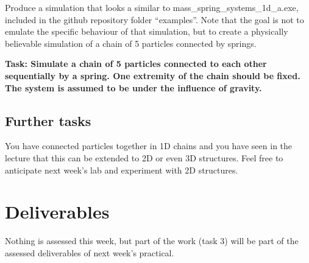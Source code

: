 \documentclass[12pt]{article}
\begin{document}
Produce a simulation that looks a similar to mass\_spring\_systems\_1d\_a.exe, included in the github repository folder ``examples''. Note that the goal is not to emulate the specific behaviour of that simulation, but to create a physically believable simulation of a chain of 5 particles connected by springs.

\textbf{Task: Simulate a chain of 5 particles connected to each other sequentially by a spring. One extremity of the chain should be fixed. The system is assumed to be under the influence of gravity.}

\subsection*{Further tasks}

You have connected particles together in 1D chains and you have seen in the lecture that this can be extended to 2D or even 3D structures. Feel free to anticipate next week’s lab and experiment with 2D structures.

\section*{Deliverables}

Nothing is assessed this week, but part of the work  (task 3) will be part of the assessed deliverables of next week's practical.
\end{document}

